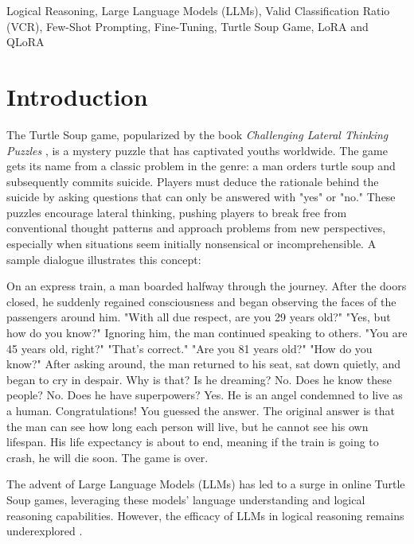 \documentclass[conference]{IEEEtran}
\begin{document}
\begin{IEEEkeywords}
Logical Reasoning, Large Language Models (LLMs), Valid Classification Ratio (VCR), Few-Shot Prompting, Fine-Tuning, Turtle Soup Game, LoRA and QLoRA
\end{IEEEkeywords}
\section{Introduction}

The Turtle Soup game, popularized by the book \textit{Challenging Lateral Thinking Puzzles} \cite{sloane1993challenging}, is a mystery puzzle that has captivated youths worldwide. The game gets its name from a classic problem in the genre: a man orders turtle soup and subsequently commits suicide. Players must deduce the rationale behind the suicide by asking questions that can only be answered with "yes" or "no." These puzzles encourage lateral thinking, pushing players to break free from conventional thought patterns and approach problems from new perspectives, especially when situations seem initially nonsensical or incomprehensible. A sample dialogue illustrates this concept:

\small{
\begin{dialogue}
 On an express train, a man boarded halfway through the journey. After the doors closed, he suddenly regained consciousness and began observing the faces of the passengers around him. "With all due respect, are you 29 years old?" "Yes, but how do you know?" Ignoring him, the man continued speaking to others. "You are 45 years old, right?" "That's correct." "Are you 81 years old?" "How do you know?" After asking around, the man returned to his seat, sat down quietly, and began to cry in despair. Why is that?
 Is he dreaming?
 No.
 Does he know these people?
 No.
 Does he have superpowers?
 Yes.
 He is an angel condemned to live as a human.
 Congratulations! You guessed the answer. The original answer is that the man can see how long each person will live, but he cannot see his own lifespan. His life expectancy is about to end, meaning if the train is going to crash, he will die soon. The game is over.
\end{dialogue}
}

The advent of Large Language Models (LLMs) has led to a surge in online Turtle Soup games, leveraging these models' language understanding and logical reasoning capabilities. However, the efficacy of LLMs in logical reasoning remains underexplored \cite{parmar2024logicbench}.
\end{document}
